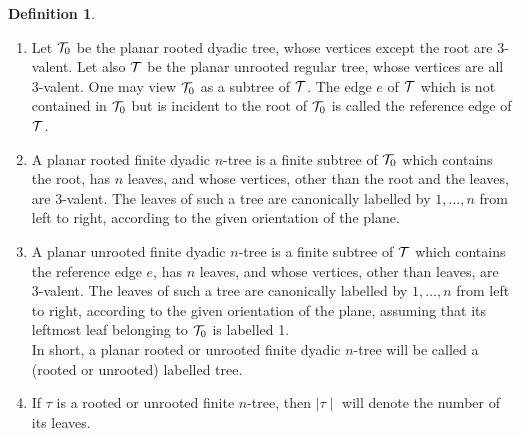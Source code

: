 \documentclass[twoside]{irmaems}
\theoremstyle{plain}
\theoremstyle{definition}
\newtheorem{definition}{Definition}[section]
\theoremstyle{remark}
\begin{document}
\begin{definition}
\begin{enumerate}
\item
Let ${\cal T}_0$ be the planar rooted dyadic tree, whose vertices except the root are 3-valent. Let also ${\cal T}$ be the planar unrooted regular tree, whose vertices are all 3-valent. One may view ${\cal T}_0$ as a subtree of ${\cal T}$. The edge $e$ of ${\cal T}$ which is not contained in ${\cal T}_0$ but is incident to the root of ${\cal T}_0$ is called the reference edge of ${\cal T}$.      
\item A planar rooted finite dyadic  $n$-tree is a finite subtree of ${\cal T}_0$ which contains the root, has $n$ leaves, and whose vertices, other than the root and the leaves, are 3-valent. The leaves of such a tree are canonically labelled by $1,\ldots,n$ from left to right, according to the given orientation of the plane.
\item  A planar unrooted finite dyadic  $n$-tree is a finite subtree of ${\cal T}$ which contains the reference 
edge  $e$, has $n$ leaves, and whose vertices, other than leaves, are 3-valent. The leaves of such a tree are canonically labelled by $1,\ldots,n$ from left to right, according to the given orientation of the plane, assuming
that its leftmost leaf belonging to ${\cal T}_0$ is  labelled 1.\\
In short, a planar rooted or unrooted finite dyadic $n$-tree will be called a (rooted or unrooted) labelled tree.
\item If $\tau$ is a rooted or unrooted finite $n$-tree, 
then $\mid \tau\mid$ will denote the number of its leaves.


\end{enumerate}

\end{definition}
\end{document}
